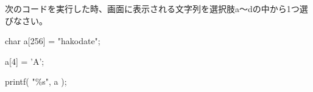 次のコードを実行した時、画面に表示される文字列を選択肢a〜dの中から1つ選びなさい。\par
\noindent char a[256] = "hakodate"; \par
\noindent a[4] = 'A'; \par
\noindent printf( "\%s", a ); \par
